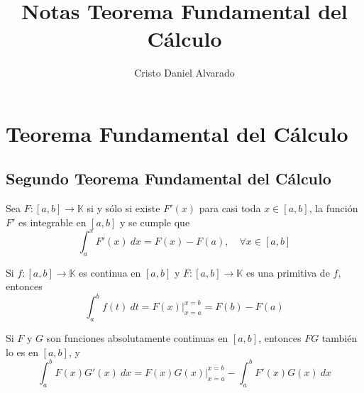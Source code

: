 \documentclass[12pt]{report}
\theoremstyle{largebreak}
\newcommand\cf[3]{\ensuremath{#1:#2\rightarrow#3}}
\begin{document}
    \setlength{\parskip}{5pt} %
    \setlength{\parindent}{12pt} %
	\title{Notas Teorema Fundamental del Cálculo}
	\author{Cristo Daniel Alvarado}
	\maketitle
	\tableofcontents %
	\setcounter{chapter}{0} %
	\chapter{Teorema Fundamental del Cálculo}
	\section{Segundo Teorema Fundamental del Cálculo}

	\begin{theor}
		Sea $\cf{F}{[a,b]}{\mathbb{K}}$ si y sólo si existe $F'(x)$ para casi toda $x\in [a,b]$, la función $F'$ es integrable en $[a,b]$ y se cumple que
		\begin{equation*}
			\int_{{a}}^{{x}} {F'(x)} \: d{x}={F(x)-F(a)},\quad \forall x\in [a,b]
		\end{equation*}
		
	\end{theor}

	\begin{cor}
		Si $\cf{f}{[a,b]}{\mathbb{K}}$ es continua en $[a,b]$ y $ \cf{F}{[a,b]}{\mathbb{K}}$ es una primitiva de $f$, entonces
		\begin{equation*}
			\int_{{a}}^{{b}} {f(t)} \: d{t}={F(x)\big|_{x=a}^{x=b}}={F(b)-F(a)}
		\end{equation*}
		
	\end{cor}
	
	\begin{theor}
		Si $F$ y $G$ son funciones absolutamente continuas en $[a,b]$, entonces $FG$ también lo es en $[a,b]$, y
		\begin{equation*}
			\int_{{a}}^{{b}} {F(x)G'(x)} \: d{x} = {F(x)G(x)\big|_{x=a}^{x=b}-\int_{{a}}^{{b}} {F'(x)G(x)} \: d{x}}			
		\end{equation*}
		
	\end{theor}
\end{document}
